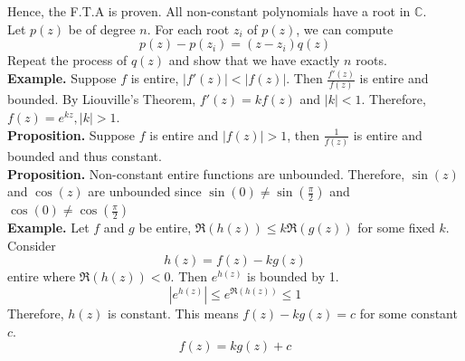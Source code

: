 \documentclass[11pt]{article}
\begin{document}
Hence, the F.T.A is proven. All non-constant polynomials have a root in $\mathbb{C}$. \\
Let $p(z)$ be of degree $n$. For each root $z_i$ of $p(z)$, we can compute 
$$p(z) - p(z_i) = (z - z_i)q(z)$$
Repeat the process of $q(z)$ and show that we have exactly $n$ roots.\\
\newpage
\textbf{Example.} Suppose $f$ is entire, $|f'(z)| < |f(z)|$. Then $\frac{f'(z)}{f(z)}$ is entire and bounded. By Liouville's Theorem, $f'(z) = kf(z)$ and $|k| < 1$. Therefore, $f(z) = e^{kz}, |k| > 1$. \\
\newline
\textbf{Proposition.} Suppose $f$ is entire and $|f(z)| > 1$, then $\frac{1}{f(z)}$ is entire and bounded and thus constant. \\
\newline
\textbf{Proposition.} Non-constant entire functions are unbounded. Therefore, $\sin(z)$ and $\cos(z)$ are unbounded since $\sin(0) \neq \sin(\frac{\pi}{2})$ and $\cos(0) \neq \cos(\frac{\pi}{2})$ \\
\newline
\textbf{Example.} Let $f$ and $g$ be entire, $\Re(h(z)) \leqslant k\Re(g(z))$ for some fixed $k$. Consider 
$$h(z) = f(z) - kg(z)$$ entire where $\Re(h(z)) < 0$. Then $e^{h(z)}$ is bounded by 1. 
$$|e^{h(z)}| \leqslant e^{\Re(h(z))} \leqslant 1$$
Therefore, $h(z)$ is constant. This means $f(z) - kg(z) = c$ for some constant $c$. 
$$f(z) = kg(z) + c$$

\newpage
\end{document}
